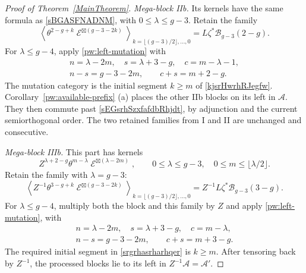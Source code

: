 \documentclass[11pt,letterpaper]{amsart}
\theoremstyle{plain}
\theoremstyle{definition}
\theoremstyle{remark}
\numberwithin{equation}{section}
\DeclareMathOperator{\cE}{\mathcal{E}}
\begin{document}
\begin{proof}[Proof of Theorem~\ref{MainTheorem}]
\smallskip
\noindent\textit{Mega-block IIb.}
Its kernels have the same formula as \eqref{sBGASFNADNM}, with
$0\leq\lambda\leq g-3$.  Retain the  family
\begin{equation}\label{kjsrHwrhRJegfw}
 \left\langle\theta^{2-g+k}\cE^{\boxtimes(g-3-2k)}
 \right\rangle_{k=\lfloor(g-3)/2\rfloor,\ldots,0}
       =L\zeta^*\mathcal B_{g-3}(2-g).
\end{equation}
For $\lambda\leq g-4$, apply \eqref{pw:left-mutation} with
\[
 \begin{gathered}
 n=\lambda-2m,\quad s=\lambda+3-g,\quad c=m-\lambda-1,\\
 n-s=g-3-2m,\qquad c+s=m+2-g.
 \end{gathered}
\]
The mutation category is the initial segment $k\geq m$ of
\eqref{kjsrHwrhRJegfw}.  
Corollary~\ref{pw:available-prefix} (a)
places the other IIb blocks on its left in $\mathcal A$.
They then commute past \eqref{sEGsrhSzxfafdbRhjdt}, by adjunction
and the current semiorthogonal order.  The two retained families
from I and II are unchanged and consecutive.

\smallskip
\noindent\textit{Mega-block IIIb.}
This part has kernels
\[
 Z^{\lambda+2-g}\theta^{m-\lambda}
       \cE^{\boxtimes(\lambda-2m)},\qquad
 0\leq\lambda\leq g-3,\quad0\leq m\leq\lfloor\lambda/2\rfloor.
\]
Retain the family with $\lambda=g-3$:
\begin{equation}\label{srgrhasrharhqer}
 \left\langle Z^{-1}\theta^{3-g+k}\cE^{\boxtimes(g-3-2k)}
 \right\rangle_{k=\lfloor(g-3)/2\rfloor,\ldots,0}
       =Z^{-1}L\zeta^*\mathcal B_{g-3}(3-g).
\end{equation}
For $\lambda\leq g-4$, multiply both the block and this family by
$Z$ and apply \eqref{pw:left-mutation}, with
\[
 \begin{gathered}
 n=\lambda-2m,\quad s=\lambda+3-g,\quad c=m-\lambda,\\
 n-s=g-3-2m,\qquad c+s=m+3-g.
 \end{gathered}
\]
The required initial segment in \eqref{srgrhasrharhqer} is $k\geq m$.
After tensoring back by $Z^{-1}$, the processed blocks lie to its
left in $Z^{-1}\mathcal A=\mathcal A'$.


\end{proof}
\end{document}
